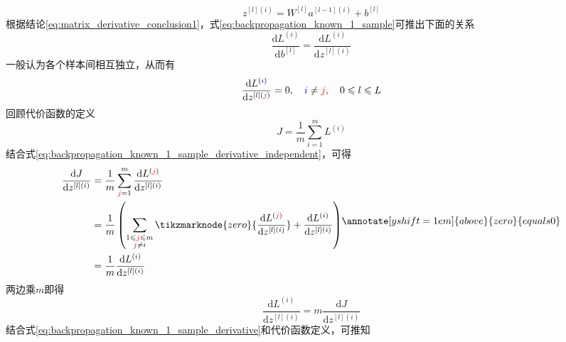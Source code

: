 \begin{equation}
    z^{[l](i)} = W^{[l]} a^{[l-1](i)} + b^{[l]}
    \label{eq:backpropagation_known_1_sample}
\end{equation}
根据结论\eqref{eq:matrix_derivative_conclusion1}，式\eqref{eq:backpropagation_known_1_sample}可推出下面的关系
\begin{equation}
    \frac{\mathrm{d}L^{(i)}}{\mathrm{d}b^{[l]}} = \frac{\mathrm{d}L^{(i)}}{\mathrm{d}z^{[l](i)}}
    \label{eq:backpropagation_known_1_sample_derivative}
\end{equation}
一般认为各个样本间相互独立，从而有
\begin{equation}
    \frac{\mathrm{d}L^{(\textcolor{blue}{i})}}{\mathrm{d}z^{[l](\textcolor{red}{j})}}=0
    , \quad \textcolor{blue}{i} \neq \textcolor{red}{j}, \quad 0 \leqslant l \leqslant L
    \label{eq:backpropagation_known_1_sample_derivative_independent}
\end{equation}
回顾代价函数的定义
\begin{equation}
    J = \frac{1}{m} \sum_{i=1}^{m} L^{(i)}
\end{equation}
结合式\eqref{eq:backpropagation_known_1_sample_derivative_independent}，可得
\begin{equation}
    \begin{aligned}
        \frac{\mathrm{d}J}{\mathrm{d}z^{[l](i)}} 
        &= \frac{1}{m}  \sum_{\textcolor{red}{j}=1}^{m} \frac{\mathrm{d}L^{(\textcolor{red}{j})}}{\mathrm{d}z^{[l](i)}} \\
        &= \frac{1}{m}  \left( \sum_{\substack{1 \leqslant \textcolor{red}{j} \leqslant m \\ \textcolor{red}{j} \neq i}} \tikzmarknode{zero}{\frac{\mathrm{d}L^{(\textcolor{red}{j})}}{\mathrm{d}z^{[l](i)}}} + \frac{\mathrm{d}L^{(i)}}{\mathrm{d}z^{[l](i)}} \right) \\
        &= \frac{1}{m} \frac{\mathrm{d}L^{(i)}}{\mathrm{d}z^{[l](i)}} \\
    \end{aligned}
    \annotate[yshift=1em]{above}{zero}{equals 0}
\end{equation}
两边乘$m$即得
\begin{equation}
    \frac{\mathrm{d}L^{(i)}}{\mathrm{d}z^{[l](i)}} = m \frac{\mathrm{d}J}{\mathrm{d}z^{[l](i)}}
\end{equation}
结合式\eqref{eq:backpropagation_known_1_sample_derivative}和代价函数定义，可推知

